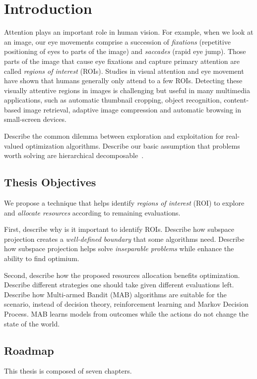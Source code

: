 \chapter{Introduction}
\label{c:intro}

Attention plays an important role in human vision. For example, when
we look at an image, our eye movements comprise a succession of {\em
fixations} (repetitive positioning of eyes to parts of the image)
and {\em saccades} (rapid eye jump). Those parts of the image that
cause eye fixations and capture primary attention are called {\em
regions of interest} (ROIs). Studies in visual attention and eye
movement have shown that humans generally only attend to a few ROIs.
Detecting these visually attentive regions in images is challenging
but useful in many multimedia applications, such as automatic
thumbnail cropping, object recognition, content-based image
retrieval, adaptive image compression and automatic browsing in
small-screen devices.

Describe the common dilemma between exploration and exploitation for real-valued optimization algorithms.
Describe our basic assumption that problems worth solving are hierarchical decomposable~\cite{herbsimon:}.

\section{Thesis Objectives}
We propose a technique that helps identify {\em regions of interest} (ROI) to explore and \textit{allocate resources} according to remaining evaluations.

First, describe why is it important to identify ROIs.
Describe how subspace projection creates a \textit{well-defined boundary} that some algorithms need.
Describe how subspace projection helps  solve \textit{inseparable problems} while enhance the ability to find optimium.

Second, describe how the proposed resources allocation benefits optimization.
Describe different strategies one should take given different evaluations left.
Describe how Multi-armed Bandit (MAB) algorithms are suitable for the scenario, instead of decision theory, reinforcement learning and Markov Decision Process.
MAB learns models from outcomes while the actions do not change the state of the world.


\section{Roadmap}
This thesis is composed of seven chapters.


